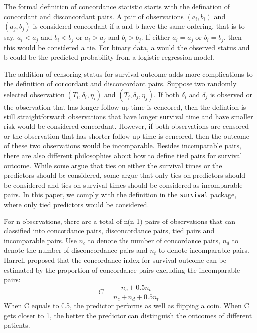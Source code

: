 \documentclass[11pt]{article}
\begin{document}
	\par The formal definition of concordance statistic starts with the defination of concordant and disconcordant pairs. A pair of observations $(a_{i}, b_{i})$ and $(a_{j}, b_{j})$ is considered concordant if a and b have the same ordering, that is to say, $a_i < a_j$ and $b_{i} < b_{j}$ or $a_i > a_j$ and $b_{i} > b_{j}$. If either $a_i = a_j$ or $b_i = b_j$, then this would be considered a tie. For binary data, a would the observed status and b could be the predicted probability from a logistic regression model. 

	\par The addition of censoring status for survival outcome adds more complications to the definition of concordant and disconcordant pairs. Suppose two randomly selected observation $(T_{i}, \delta_{i}, \eta_{i})$ and $(T_{j}, \delta_{j}, \eta_{j})$. If both $\delta_{i}$ and $\delta_{j}$ is observed or the observation that has longer follow-up time is cencored, then the defintion is still straightforward: observations that have longer survival time and have smaller risk would be considered concordant. However, if both observations are censored or the observation that has shorter follow-up time is cencored, then the outcome of these two observations would be incomparable. Besides incomparable pairs, there are also different philosophies about how to define tied pairs for survival outcome. While some argue that ties on either the survival times or the predictors should be considered, some argue that only ties on predictors should be considered and ties on survival times should be considered as incomparable pairs. In this paper, we comply with the definition in the \texttt{survival} package, where only tied predictors would be considered.

	\par For n observations, there are a total of n(n-1) pairs of observations that can classified into concordance pairs, disconcordance pairs, tied pairs and incomparable pairs. Use $n_{c}$ to denote the number of concordance pairs, $n_{d}$ to denote the number of disconcordance pairs and $n_{t}$ to denote incomparable pairs. Harrell proposed that the concordance index for survival outcome can be estimated by the proportion of concordance pairs excluding the incomparable pairs: $$C = \frac{n_c + 0.5 n_{t}}{n_c + n_d + 0.5n_t}$$ When C equals to 0.5, the predictor performs as well as flipping a coin. When C gets closer to 1, the better the predictor can distinguish the outcomes of different patients.
\end{document}
